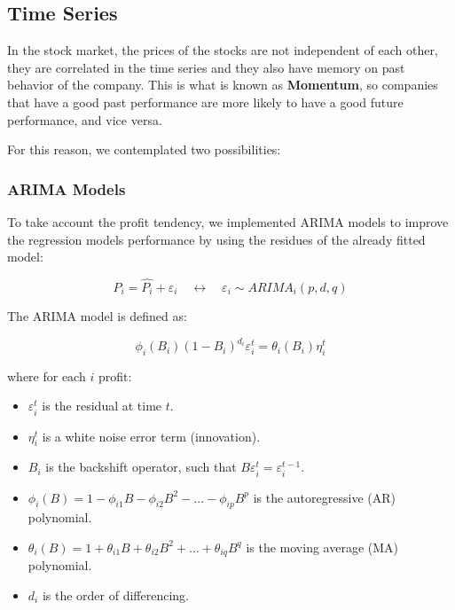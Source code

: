 \documentclass[11pt,english,a4paper,hidelinks]{book}
\begin{document}
\subsection{Time Series}
In the stock market, the prices of the stocks are not independent of each other, they are correlated in the time series and they also have memory on past behavior of the company. This is what is known as \textbf{Momentum}, so companies that have a good past performance are more likely to have a good future performance, and vice versa.

\vspace{0.5cm}
\noindent For this reason, we contemplated two possibilities:

\subsubsection{ARIMA Models}
To take account the profit tendency, we implemented ARIMA models to improve the regression models performance by using the residues of the already fitted model:

\begin{equation}
    P_i = \hat{P_i} + {\varepsilon_i} \quad \longleftrightarrow \quad {\varepsilon_i} \sim ARIMA_i(p,d,q)
\end{equation}

\noindent The ARIMA model is defined as:

\begin{equation}
    \phi_i(B_i)(1 - B_i)^{d_i} \varepsilon_i^t = \theta_i(B_i) \eta_i^t
    \end{equation}
    
    \noindent where for each $i$ profit:
    \begin{itemize}
      \item \(\varepsilon_i^t\) is the residual at time \(t\).
      \item \(\eta_i^t\) is a white noise error term (innovation).
      \item \(B_i\) is the backshift operator, such that \(B \varepsilon_i^t = \varepsilon_i^{t-1}\).
      \item \(\phi_i(B) = 1 - \phi_{i1} B - \phi_{i2} B^2 - \dots - \phi_{ip} B^p\) is the autoregressive (AR) polynomial.
      \item \(\theta_i(B) = 1 + \theta_{i1} B + \theta_{i2} B^2 + \dots + \theta_{iq} B^q\) is the moving average (MA) polynomial.
      \item \(d_i\) is the order of differencing.
    \end{itemize}
    
\end{document}
